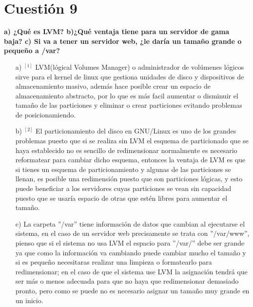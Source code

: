 \documentclass[a4paper, 11pt]{article} %
\begin{document}
\section{Cuestión 9}
\textbf{a) ¿Qué es LVM? b)¿Qué ventaja tiene para un servidor de gama baja? c) Si va a tener un servidor web, ¿le daría un tamaño grande o pequeño a /var?}\\ 
\begin{itemize}
\item[a)]$^{[1]}$ LVM(lógical Volumes Manager) o administrador de volúmenes lógicos sirve para el kernel de linux que gestiona unidades de disco y dispositivos de almacenamiento masivo, además hace posible crear un espacio de almacenamiento abstracto, por lo que es más facil aumentar o disminuir el tamaño de las particiones y eliminar o crear particiones evitando problemas de posicionamiendo.
\item[b)] $^{[2]}$ El particionamiento del disco en GNU/Linux es uno de los grandes problemas puesto que si se realiza sin LVM el esquema de particionado que se haya establecido no es sencillo de redimensionar normalmente es necesario reformatear para cambiar dicho esquema, entonces la ventaja de LVM es que si tienes un esquema de particionamiento y algunas de las particiones se llenan, es posible una redimensión puesto que son particiones lógicas, y esto puede beneficiar a los servidores cuyas particiones se vean sin capacidad puesto que se usaría espacio de otras que estén libres para aumentar el tamaño.
\item[c)] La carpeta ''/var'' tiene información de datos que cambian al ejecutarse el sistema, en el caso de un servidor web precisamente se trata con ''/var/www'', pienso que si el sistema no usa LVM el espacio para ''/var/'' debe ser grande ya que como la información va cambiando puede cambiar mucho el tamaño y si es pequeño necesitaras realizar una limpieza o formatearlo para redimensionar; en el caso de que el sistema use LVM la asignación tendrá que ser más o menos adecuada para que no haya que redimensionar demasiado pronto, pero como se puede no es necesario asignar un tamaño muy grande en un inicio. 
\end{itemize}
\end{document}
